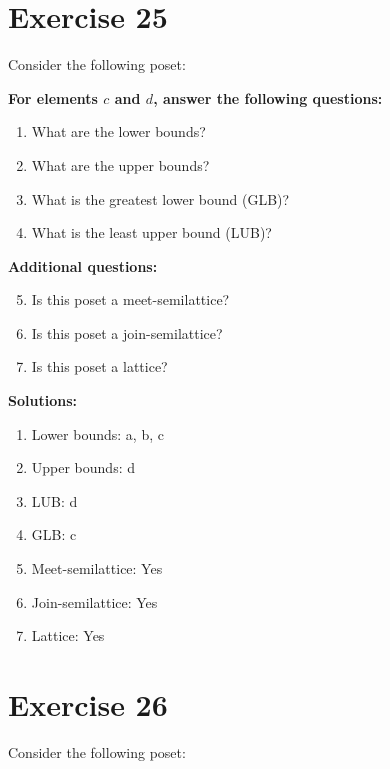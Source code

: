 \documentclass{article}
\begin{document}
\section*{Exercise 25}
Consider the following poset:
\begin{center}
\end{center}

    \textbf{For elements $c$ and $d$, answer the following questions:}
\begin{enumerate}
    \item What are the lower bounds?
    \item What are the upper bounds?
    \item What is the greatest lower bound (GLB)?
    \item What is the least upper bound (LUB)?
\end{enumerate}
    \hspace*{3ex} \textbf{Additional questions:}
\begin{enumerate}
    \setcounter{enumi}{4}
    \item Is this poset a meet-semilattice?
    \item Is this poset a join-semilattice?
    \item Is this poset a lattice?
\end{enumerate}

\textbf{Solutions:}
\begin{enumerate}
    \item Lower bounds: {a, b, c}
    \item Upper bounds: {d}
    \item LUB: d
    \item GLB: c
    \item Meet-semilattice: Yes
    \item Join-semilattice: Yes
    \item Lattice: Yes
\end{enumerate}
\newpage
\section*{Exercise 26}
Consider the following poset:
\begin{center}
\end{center}
\end{document}
